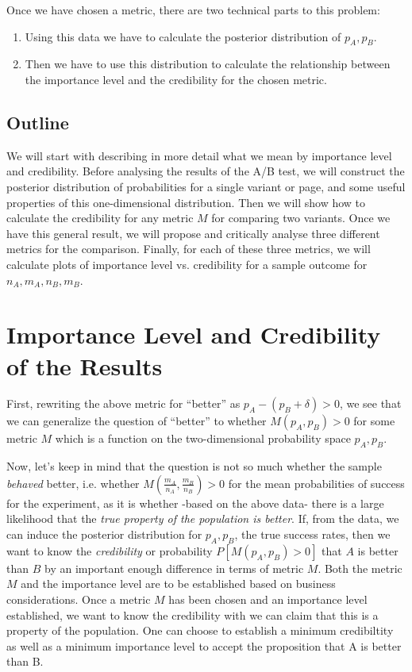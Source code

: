 \documentclass[12pt]{report}
\newcommand{\be}{\begin{enumerate}} %
\newcommand{\ee}{\end{enumerate}} %
\begin{document}
Once we have chosen a metric, there are two technical parts to this
problem:
\be
\item Using this data we have to calculate the posterior distribution
  of \(p_A, p_B\).
\item Then we have to use this distribution to calculate the
  relationship between the importance level and the credibility for
  the chosen metric.
\ee

\subsection{Outline}
We will start with describing in more detail what we mean by importance
level and credibility. Before analysing the results of the A/B test, we will
construct the posterior distribution of probabilities
for a single variant or page, and some useful properties of this
one-dimensional distribution. Then we will show how to calculate the
credibility for any metric \(M\) for comparing two variants. Once we have this
general result, we will propose and critically
analyse three different metrics for the comparison. Finally, for each of
these three metrics, we will calculate plots of importance level vs.
credibility for a sample outcome for \(n_A, m_A, n_B, m_B\).

\section{Importance Level and Credibility of the Results}
First, rewriting the above metric for ``better'' as \(p_A - (p_B +
\delta) > 0\), we see that we can generalize the question of ``better''
to whether
\(M(p_A, p_B)>0\) for some metric \(M\) which is a function on
the two-dimensional probability space \(p_A, p_B\).

Now, let's keep in mind that the question is not so much whether the
sample {\em behaved} better, i.e. whether
\(M(\frac{m_A}{n_A}, \frac{m_B}{n_B})>0\) for the mean probabilities of
success for the experiment, as it is
whether -based on the above data- there is a large likelihood that
the {\em true property of the population is better}.
If, from the data, we can induce the posterior
distribution for \(p_A, p_B\), the true success rates,
then we want to know the {\it credibility } or
probability \(P[M(p_A, p_B)>0]\) that \(A\) is better than \(B\) by an
important enough difference in terms of
metric \(M\). Both the metric \(M\) and the importance level are to be
established based on business considerations. Once a metric \(M\) has
been chosen and an importance level established, we want to know the
credibility with we can claim that this is a property of the population.
One can choose to establish a minimum credibiltity as well as a minimum
importance level to accept the proposition that A is better than B.
\end{document}
